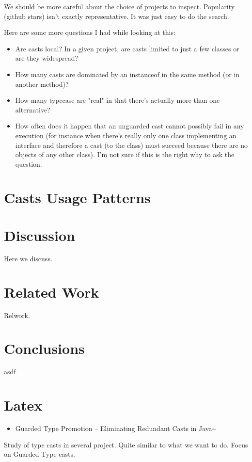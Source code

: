 We should be more careful about the choice of projects to inspect. 
Popularity (github stars) isn't exactly representative. 
It was just easy to do the search. 

Here are some more questions I had while looking at this: 
\begin{itemize}
\item Are casts local? In a given project, are casts limited to just a few classes or are they widespread?
\item How many casts are dominated by an instanceof in the same method (or in another method)?
\item How many typecase are "real" in that there's actually more than one alternative?
\item How often does it happen that an unguarded cast cannot possibly fail in any execution (for instance when there's really only one class implementing an interface and therefore a cast (to the class) must succeed because there are no objects of any other class). I'm not sure if this is the right why to ask the question.
\end{itemize}

\section{Casts Usage Patterns \label{org20ce513}}
\label{sec:org97dafed}

\section{Discussion \label{orgd75d6be}}
\label{sec:orge058424}

Here we discuss.

\section{Related Work \label{orgaf6f25f}}
\label{sec:org2b0e76a}

Relwork.


\section{Conclusions \label{org1ebcdd3}}
\label{sec:orga65ac61}
asdf

\section{Latex}
\label{sec:orga60307d}
\begin{itemize}
\item Guarded Type Promotion -- Eliminating Redundant Casts in Java\textasciitilde{}\cite{Winther:2011:GTP:2076674.2076680}
\end{itemize}
Study of type casts in several project. 
Quite similar to what we want to do. 
Focus on Guarded Type casts. 

